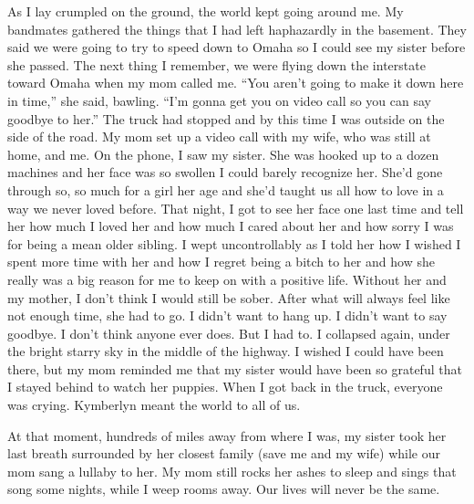 \documentclass[12pt, letterpaper]{article}
\begin{document}
\begin{flushleft}
As I lay crumpled on the ground,
the world kept going around me.
My bandmates gathered the things
that I had left haphazardly in the basement.
They said we were going to try to speed down to Omaha
so I could see my sister before she passed.
The next thing I remember, we were flying down the 
interstate toward Omaha when my mom called me.
``You aren't going to make it down here in time,\@''
she said, bawling.
``I'm gonna get you on video call so you can say goodbye to her.\@''
The truck had stopped and by this time I was outside on the side of the road.
My mom set up a video call with my wife, who was still at home, and me.
On the phone, I saw my sister.
She was hooked up to a dozen machines and
her face was so swollen I could barely recognize her.
She'd gone through so, so much for a girl her age and
she'd taught us all how to love in a way we never loved before.
That night, I got to see her face one last time and tell her how much
I loved her and how much I cared about her and how sorry
I was for being a mean older sibling.
I wept uncontrollably as I told her how I wished I spent more time with her
and how I regret being a bitch to her and how she really
was a big reason for me to keep on with a positive life.
Without her and my mother, I don’t think I would still be sober.
After what will always feel like not enough time,
she had to go.
I didn’t want to hang up.
I didn’t want to say goodbye.
I don’t think anyone ever does.
But I had to.
I collapsed again, under the bright starry sky in the middle of the highway.
I wished I could have been there, but my mom reminded me that my
sister would have been so grateful that I stayed behind to watch her puppies.
When I got back in the truck, 
everyone was crying.
Kymberlyn meant the world to all of us. 
\vspace{5mm}


At that moment, hundreds of miles away from where I was,
my sister took her last breath surrounded by her closest family
(save me and my wife) while our mom sang a lullaby to her.
My mom still rocks her ashes to sleep and sings that song some nights,
while I weep rooms away.
Our lives will never be the same.






\end{flushleft}
\end{document}
